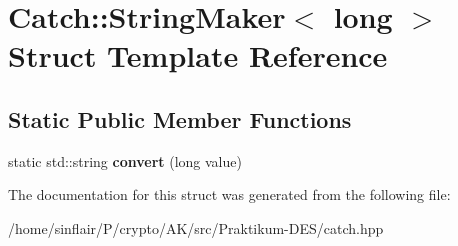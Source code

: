 \hypertarget{structCatch_1_1StringMaker_3_01long_01_4}{}\section{Catch\+:\+:String\+Maker$<$ long $>$ Struct Template Reference}
\label{structCatch_1_1StringMaker_3_01long_01_4}
\subsection*{Static Public Member Functions}
\begin{DoxyCompactItemize}
\item 
\mbox{\label{structCatch_1_1StringMaker_3_01long_01_4_a1c0c56497813e7a6425c5411d5e66447}} 
static std\+::string {\bfseries convert} (long value)
\end{DoxyCompactItemize}


The documentation for this struct was generated from the following file\+:\begin{DoxyCompactItemize}
\item 
/home/sinflair/\+P/crypto/\+A\+K/src/\+Praktikum-\/\+D\+E\+S/catch.\+hpp\end{DoxyCompactItemize}
